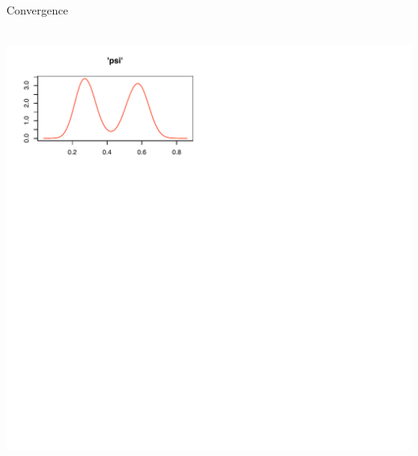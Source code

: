 \documentclass{beamer}
\begin{document}
\begin{frame}{Convergence}
	\begin{center}
		 \\
		\includegraphics[scale=0.8]{Figures/R/distnNoConvergence.pdf} \\
	\end{center}
\end{frame}
\end{document}

